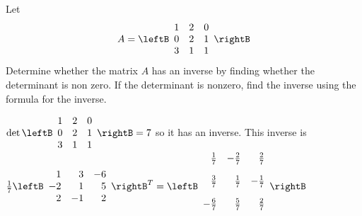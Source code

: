 \begin{enumialphparenastyle}
\begin{ex} Let 
\begin{equation*}
A=
\leftB
\begin{array}{rrr}
1 & 2 & 0 \\
0 & 2 & 1 \\
3 & 1 & 1
\end{array}
\rightB
\end{equation*}
Determine whether the matrix $A$ has an inverse by finding whether the
determinant is non zero. If the determinant is nonzero, find the inverse
using the formula for the inverse.
\begin{sol}
$\det
\leftB
\begin{array}{ccc}
1 & 2 & 0 \\
0 & 2 & 1 \\
3 & 1 & 1
\end{array}
\rightB = 7$ so it has an inverse. This inverse is $\frac{1}{7}
\leftB
\begin{array}{rrr}
1 & 3 & -6 \\
-2 & 1 & 5 \\
2 & -1 & 2
\end{array}
\rightB^{T} = \leftB
\begin{array}{rrr}
\vspace{0.05in}\frac{1}{7} & -\vspace{0.05in}\frac{2}{7} & \vspace{0.05in}\frac{2}{7} \\
\vspace{0.05in}\frac{3}{7} & \vspace{0.05in}\frac{1}{7} & -\vspace{0.05in}\frac{1}{7} \\
-\vspace{0.05in}\frac{6}{7} & \vspace{0.05in}\frac{5}{7} & \vspace{0.05in}\frac{2}{7}
\end{array}
\rightB $
\end{sol}
\end{ex}


\end{enumialphparenastyle}
